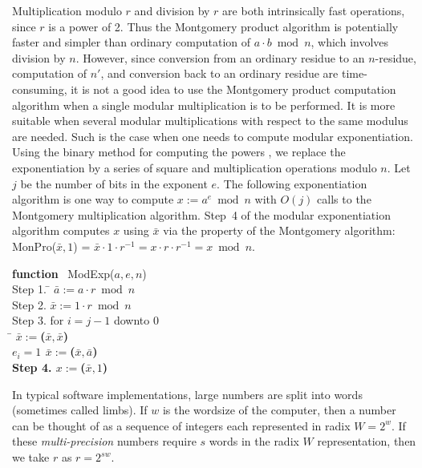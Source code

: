 \documentclass[twocolumn]{svjour3}          %
\begin{document}
\noindent
Multiplication modulo $r$ and division by $r$ are both
intrinsically fast operations, since $r$ is a power of 2.
Thus the Montgomery product algorithm is potentially faster
and simpler than ordinary computation of $a \cdot b \bmod{n}$,
which involves division by $n$.
However, since conversion from
an ordinary residue to an $n$-residue, computation of $n'$, and conversion
back to an ordinary residue are time-consuming, it is not a
good idea to use the Montgomery product computation algorithm when a single
modular multiplication is to be performed. It is more suitable when several
modular multiplications with respect to the same modulus are needed.
Such is the case when one needs to compute modular exponentiation.
Using the binary method for computing
the powers \cite{K81:Seminumerical}, we replace the exponentiation
by a series of square and multiplication operations modulo $n$.
Let $j$ be the number of bits in the exponent $e$.  The following
exponentiation algorithm is one way to compute $x:=a^e \bmod{n}$ with
$O(j)$ calls to the Montgomery multiplication algorithm.
Step~4 of the modular exponentiation algorithm computes $x$ using
$\bar{x}$ via the property of the Montgomery algorithm:
MonPro($\bar{x},1$) = $\bar{x}\cdot 1 \cdot r^{-1} = x\cdot r \cdot r^{-1}=
x \bmod{n}$.

\begin{tabbing}
\hspace*{.2in}\={\bf function} ~ModExp($a,e,n$)\\
\>Step 1.\hspace*{1ex} \= $\bar{a} := a\cdot r \bmod{n}$ \\
\>Step 2. \> $\bar{x} := 1\cdot r \bmod{n}$ \\
\>Step 3. \> for $i=j-1$ downto 0 \\
\>        \> \hspace*{1.5ex} \= $\bar{x}:=$\bf\mon($\bar{x},\bar{x}$) \\
\>        \>    \> \bif $e_i=1$ \bthen $\bar{x}:=$\mon ($\bar{x},\bar{a}$) \\
\>Step 4. \> \bret $x:=$\mon($\bar{x},1$)
\end{tabbing}

In typical software implementations, large numbers are split into
words (sometimes called limbs). If $w$ is the wordsize of the
computer, then a number can be thought of as a sequence of integers
each represented in radix $W=2^w$. If these \textit{multi-precision}
numbers require $s$ words in the radix $W$ representation, then we
take $r$ as $r=2^{sw}$.
\end{document}
